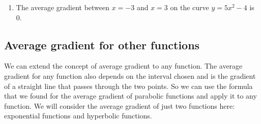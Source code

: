 {\begin{mdframed}[linewidth=4, leftmargin=40, rightmargin=40]
\begin{exercise}
\begin{enumerate}[noitemsep, label=\textbf{Step} \textbf{\arabic*}. ]
{\begin{minipage}{\columnwidth}
    \parbox[t]{48pt}{\raggedleft 
    (10.8)}
    \end{minipage}\vspace{12pt}\par
    }%
        \item  
        \label{m39223*id191621}The average gradient between $x=-3$ and \begin{math}x=3\end{math} on the curve \begin{math}y=5{x}^{2}-4\end{math} is 0.
 \par 
        \end{enumerate}
    \end{exercise}
    \end{mdframed}
    }
    \noindent
\label{m39223*secfhsst356}
            \subsection{ Average gradient for other functions}
            \nopagebreak
\label{m39223*id7342}We can extend the concept of average gradient to any function. The average gradient for any function also depends on the interval chosen and is the gradient of a straight line that passes through the two points. So we can use the formula that we found for the average gradient of parabolic functions and apply it to any function. We will consider the average gradient of just two functions here: exponential functions and hyperbolic functions.
\par 
\label{m39223*cid452}
